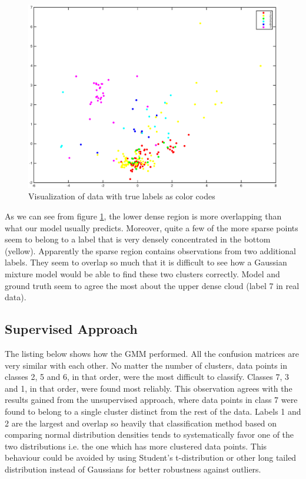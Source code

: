 \documentclass[a4paper]{article}
\begin{document}
\begin{figure}[H]
	\includegraphics[trim={3.5cm 1.5cm 3cm 1.3cm},clip,scale=0.45]{MDS_true_labels.eps}
	\caption{Visualization of data with true labels as color codes}
	\label{true_labels}
\end{figure}

As we can see from figure \ref{true_labels}, the lower dense region is more overlapping than what our model usually predicts. Moreover,  quite a few of the more sparse points seem to belong to a label that is very densely concentrated in the bottom (yellow). Apparently the sparse region contains observations from two additional labels. They seem to overlap so much that it is difficult to see how a Gaussian mixture model would be able to find these two clusters correctly. Model and ground truth seem to agree the most about the upper dense cloud (label 7 in real data). 

\subsection{Supervised Approach}

The listing below shows how the GMM performed.
All the confusion matrices are very similar with each other. No matter the
number of clusters, data points in classes 2, 5 and 6, in that order, were the
most difficult to classify. Classes 7, 3 and 1, in that order, were found most
reliably. This observation agrees with the results gained from the unsupervised
approach, where data points in class 7 were found to belong to a single cluster
distinct from the rest of the data. Labels 1 and 2 are the largest and
overlap so heavily that classification method based on comparing normal
distribution densities tends to systematically favor one of the two
distributions i.e. the one which has more clustered data points. This behaviour
could be avoided by using Student's t-distribution or other long tailed
distribution instead of Gaussians for better robustness against outliers.
\end{document}
